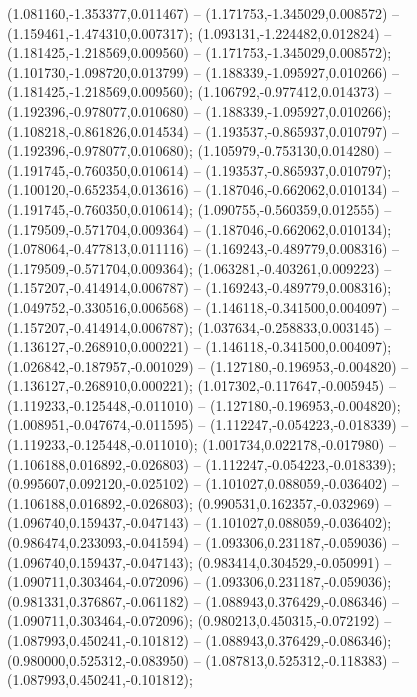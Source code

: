  (1.081160,-1.353377,0.011467) -- (1.171753,-1.345029,0.008572) -- (1.159461,-1.474310,0.007317);
 (1.093131,-1.224482,0.012824) -- (1.181425,-1.218569,0.009560) -- (1.171753,-1.345029,0.008572);
 (1.101730,-1.098720,0.013799) -- (1.188339,-1.095927,0.010266) -- (1.181425,-1.218569,0.009560);
 (1.106792,-0.977412,0.014373) -- (1.192396,-0.978077,0.010680) -- (1.188339,-1.095927,0.010266);
 (1.108218,-0.861826,0.014534) -- (1.193537,-0.865937,0.010797) -- (1.192396,-0.978077,0.010680);
 (1.105979,-0.753130,0.014280) -- (1.191745,-0.760350,0.010614) -- (1.193537,-0.865937,0.010797);
 (1.100120,-0.652354,0.013616) -- (1.187046,-0.662062,0.010134) -- (1.191745,-0.760350,0.010614);
 (1.090755,-0.560359,0.012555) -- (1.179509,-0.571704,0.009364) -- (1.187046,-0.662062,0.010134);
 (1.078064,-0.477813,0.011116) -- (1.169243,-0.489779,0.008316) -- (1.179509,-0.571704,0.009364);
 (1.063281,-0.403261,0.009223) -- (1.157207,-0.414914,0.006787) -- (1.169243,-0.489779,0.008316);
 (1.049752,-0.330516,0.006568) -- (1.146118,-0.341500,0.004097) -- (1.157207,-0.414914,0.006787);
 (1.037634,-0.258833,0.003145) -- (1.136127,-0.268910,0.000221) -- (1.146118,-0.341500,0.004097);
 (1.026842,-0.187957,-0.001029) -- (1.127180,-0.196953,-0.004820) -- (1.136127,-0.268910,0.000221);
 (1.017302,-0.117647,-0.005945) -- (1.119233,-0.125448,-0.011010) -- (1.127180,-0.196953,-0.004820);
 (1.008951,-0.047674,-0.011595) -- (1.112247,-0.054223,-0.018339) -- (1.119233,-0.125448,-0.011010);
 (1.001734,0.022178,-0.017980) -- (1.106188,0.016892,-0.026803) -- (1.112247,-0.054223,-0.018339);
 (0.995607,0.092120,-0.025102) -- (1.101027,0.088059,-0.036402) -- (1.106188,0.016892,-0.026803);
 (0.990531,0.162357,-0.032969) -- (1.096740,0.159437,-0.047143) -- (1.101027,0.088059,-0.036402);
 (0.986474,0.233093,-0.041594) -- (1.093306,0.231187,-0.059036) -- (1.096740,0.159437,-0.047143);
 (0.983414,0.304529,-0.050991) -- (1.090711,0.303464,-0.072096) -- (1.093306,0.231187,-0.059036);
 (0.981331,0.376867,-0.061182) -- (1.088943,0.376429,-0.086346) -- (1.090711,0.303464,-0.072096);
 (0.980213,0.450315,-0.072192) -- (1.087993,0.450241,-0.101812) -- (1.088943,0.376429,-0.086346);
 (0.980000,0.525312,-0.083950) -- (1.087813,0.525312,-0.118383) -- (1.087993,0.450241,-0.101812);
